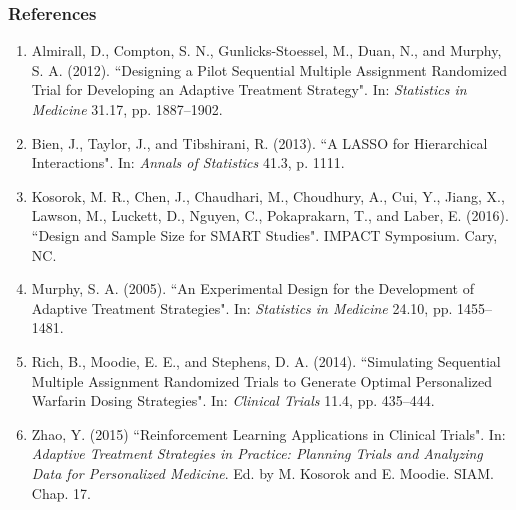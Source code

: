 \documentclass[xcolor=dvipsnames]{beamer}
\newcommand{\backupend}{
	\addtocounter{framenumberappendix}{-\value{framenumber}}
	\addtocounter{framenumber}{\value{framenumberappendix}} 
}
\newcommand\Fontvi{\fontsize{8}{10}\selectfont}
\begin{document}
\begin{frame}
 \frametitle{References}
 	\Fontvi
	\begin{enumerate}
		\item Almirall, D., Compton, S. N., Gunlicks-Stoessel, M., Duan, N., and Murphy, S. A. (2012). ``Designing a Pilot Sequential Multiple Assignment Randomized Trial for Developing an Adaptive Treatment Strategy". In: \textit{Statistics in Medicine} 31.17, pp. 1887--1902.
		\item Bien, J., Taylor, J., and Tibshirani, R. (2013). ``A LASSO for Hierarchical Interactions". In: \textit{Annals of Statistics} 41.3, p. 1111.
		\item Kosorok, M. R., Chen, J., Chaudhari, M., Choudhury, A., Cui, Y., Jiang, X., Lawson, M., Luckett, D., Nguyen, C., Pokaprakarn, T., and Laber, E. (2016). ``Design and Sample Size for SMART Studies". IMPACT Symposium. Cary, NC.
		\item Murphy, S. A. (2005). ``An Experimental Design for the Development of Adaptive Treatment Strategies". In: \textit{Statistics in Medicine} 24.10, pp. 1455--1481.
		\item Rich, B., Moodie, E. E., and Stephens, D. A. (2014). ``Simulating Sequential Multiple Assignment Randomized Trials to Generate Optimal Personalized Warfarin Dosing Strategies". In: \textit{Clinical Trials} 11.4, pp. 435--444.
		\item Zhao, Y. (2015) ``Reinforcement Learning Applications in Clinical Trials". In: \textit{Adaptive Treatment Strategies in Practice: Planning Trials and Analyzing Data for Personalized Medicine}. Ed. by M. Kosorok and E. Moodie. SIAM. Chap. 17.
	\end{enumerate}
\end{frame}

\backupend
\end{document}
